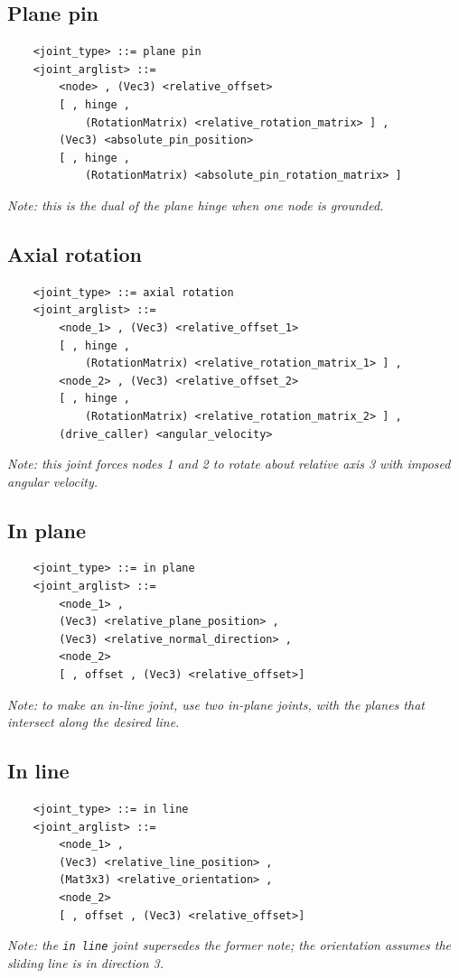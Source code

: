 \documentclass[10pt,dvips]{report}
\begin{document}
\subsection{Plane pin}
\begin{verbatim}
    <joint_type> ::= plane pin
    <joint_arglist> ::= 
        <node> , (Vec3) <relative_offset>
        [ , hinge , 
            (RotationMatrix) <relative_rotation_matrix> ] ,
        (Vec3) <absolute_pin_position>
        [ , hinge , 
            (RotationMatrix) <absolute_pin_rotation_matrix> ]
\end{verbatim}
{\em
    Note: this is the dual of the plane hinge when one node is grounded.
}

\subsection{Axial rotation}
\begin{verbatim}
    <joint_type> ::= axial rotation
    <joint_arglist> ::= 
        <node_1> , (Vec3) <relative_offset_1> 
        [ , hinge , 
            (RotationMatrix) <relative_rotation_matrix_1> ] ,
        <node_2> , (Vec3) <relative_offset_2>
        [ , hinge , 
            (RotationMatrix) <relative_rotation_matrix_2> ] ,
        (drive_caller) <angular_velocity>
\end{verbatim}
{\em
    Note: this joint forces nodes 1 and 2 to rotate about relative 
    axis 3 with imposed angular velocity.
}

\subsection{In plane}
\begin{verbatim}
    <joint_type> ::= in plane
    <joint_arglist> ::= 
        <node_1> , 
        (Vec3) <relative_plane_position> ,
        (Vec3) <relative_normal_direction> ,
        <node_2>
        [ , offset , (Vec3) <relative_offset>]
\end{verbatim}
{\em
    Note: to make an in-line joint, use two in-plane joints, with the
    planes that intersect along the desired line.
}

\subsection{In line}
\begin{verbatim}
    <joint_type> ::= in line
    <joint_arglist> ::= 
        <node_1> , 
        (Vec3) <relative_line_position> ,
        (Mat3x3) <relative_orientation> ,
        <node_2>
        [ , offset , (Vec3) <relative_offset>]
\end{verbatim}
{\em 
    Note: the {\tt in line} joint supersedes the former note; the orientation
    assumes the sliding line is in direction 3.
}
\end{document}

